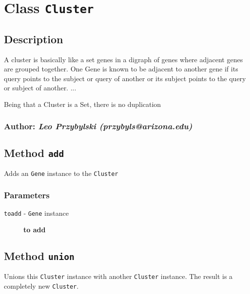 
\section{Class \texttt{Cluster}\label{Class_Cluster}}
\subsection*{Description\label{Description}}


A cluster is basically like a set genes in a digraph of genes where 
adjacent genes are grouped together. One Gene is known to be adjacent 
to another gene if its query points to the subject or query of another
or its subject points to the query or subject of another.
...



Being that a Cluster is a Set, there is no duplication

\subsubsection*{Author: \textit{Leo Przybylski (przybyls@arizona.edu)}\label{Author:_Leo_Przybylski_przybyls_arizona_edu_}}
\subsection*{Method \texttt{add}\label{Method_add}}


Adds an \texttt{Gene} instance to the \texttt{Cluster}

\subsubsection*{Parameters\label{Parameters}}
\begin{description}

\item[{\texttt{toadd} - \texttt{Gene} instance}] \textbf{to add}\end{description}
\subsection*{Method \texttt{union}\label{Method_union}}


Unions this \texttt{Cluster} instance with another \texttt{Cluster} instance. The result
is a completely new \texttt{Cluster}.

